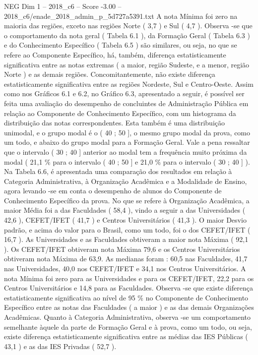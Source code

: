 \begin{textsample}{NEG Dim 1 – 2018\_c6 – Score -3.00 – 2018\_c6/enade\_2018\_admin\_p\_5d727a5391.txt}
A nota Mínima foi zero na maioria das regiões, exceto nas regiões Norte ( 3,7 ) e Sul ( 4,7 ).
Observa -se que o comportamento da nota geral ( Tabela 6.1 ), da Formação Geral ( Tabela 6.3 ) e do Conhecimento Específico ( Tabela 6.5 ) são similares, ou seja, no que se refere ao Componente Específico, há, também, diferença estatisticamente significativa entre as notas extremas ( a maior, região Sudeste, e a menor, região Norte ) e as demais regiões.
Concomitantemente, não existe diferença estatisticamente significativa entre as regiões Nordeste, Sul e Centro-Oeste.
Assim como nos Gráficos 6.1 e 6.2, no Gráfico 6.3, apresentado a seguir, é possível ser feita uma avaliação do desempenho de concluintes de Administração Pública em relação ao Componente de Conhecimento Específico, com um histograma da distribuição das notas correspondentes.
Esta também é uma distribuição unimodal, e o grupo modal é o ( 40 ; 50 ], o mesmo grupo modal da prova, como um todo, e abaixo do grupo modal para a Formação Geral.
Vale a pena ressaltar que o intervalo ( 30 ; 40 ] anterior ao modal tem a frequência muito próxima da modal ( 21,1 \% para o intervalo ( 40 ; 50 ] e 21,0 \% para o intervalo ( 30 ; 40 ] ).
Na Tabela 6.6, é apresentada uma comparação dos resultados em relação à Categoria Administrativa, à Organização Acadêmica e a Modalidade de Ensino, agora levando -se em conta o desempenho de alunos do Componente de Conhecimento Específico da prova.
No que se refere à Organização Acadêmica, a maior Média foi a das Faculdades ( 58,4 ), vindo a seguir a das Universidades ( 42,6 ), CEFET/IFET ( 41,7 ) e Centros Universitários ( 41,3 ).
O maior Desvio padrão, e acima do valor para o Brasil, como um todo, foi o dos CEFET/IFET ( 16,7 ).
As Universidades e as Faculdades obtiveram a maior nota Máxima ( 92,1 ).
Os CEFET/IFET obtiveram nota Máxima 79,6 e os Centros Universitários obtiveram nota Máxima de 63,9.
As medianas foram : 60,5 nas Faculdades, 41,7 nas Universidades, 40,0 nos CEFET/IFET e 34,1 nos Centros Universitários.
A nota Mínima foi zero para as Universidades e para os CEFET/IFET, 22,2 para os Centros Universitários e 14,8 para as Faculdades.
Observa -se que existe diferença estatisticamente significativa ao nível de 95 \% no Componente de Conhecimento Específico entre as notas das Faculdades ( a maior ) e as das demais Organizações Acadêmicas.
Quanto à Categoria Administrativa, observa -se um comportamento semelhante àquele da parte de Formação Geral e à prova, como um todo, ou seja, existe diferença estatisticamente significativa entre as médias das IES Públicas ( 43,1 ) e as das IES Privadas ( 52,7 ).

\end{textsample}

